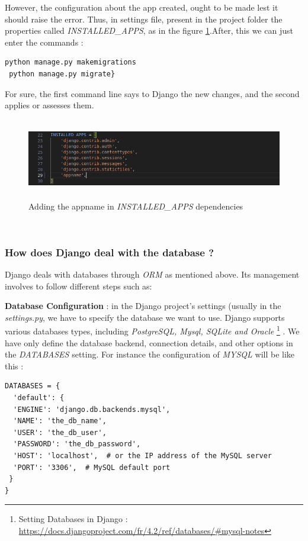 \documentclass[12pt,a4paper]{report}
\begin{document}
 \newline However, the configuration about the app created, ought to be made lest it should raise the error. Thus, in settings file, present in the project folder the properties called \textit{INSTALLED\_APPS}, as in the figure \ref{fig:appinstallname}.\newline After, this we can just enter the commands : 
 \begin{lstlisting}[style=stylepython]
 python manage.py makemigrations
 python manage.py migrate}
\end{lstlisting}
For sure, the first command line says to Django the new changes, and the second applies or assesses them. 
\begin{figure}
	\centering
	\includegraphics[width=1\linewidth, height=3.5cm]{appInstallName}
	\caption{Adding the appname in \textit{INSTALLED\_APPS} dependencies }
	\label{fig:appinstallname}
\end{figure} 
\\
\newline
\subsubsection*{How does Django deal with the database ?} 
Django deals with databases through \textit{ORM} as mentioned above. Its management involves to follow different steps such as:

\textbf{Database Configuration } : in the Django project's settings (usually in the \textit{settings.py}, we have to specify the database we want to use. Django supports various databases types, including \textit{PostgreSQL, Mysql, SQLite and Oracle} \footnote{Setting Databases in Django : \url{https://docs.djangoproject.com/fr/4.2/ref/databases/\#mysql-notes}}  . We have only define the database backend, connection details, and other options in the \textit{DATABASES} setting. For instance the configuration of \textit{MYSQL} will be like this : 
\begin{lstlisting}[style=stylepython]
DATABASES = {
  'default': {
  'ENGINE': 'django.db.backends.mysql',
  'NAME': 'the_db_name',
  'USER': 'the_db_user',
  'PASSWORD': 'the_db_password',
  'HOST': 'localhost',  # or the IP address of the MySQL server
  'PORT': '3306',  # MySQL default port
 }
}
\end{lstlisting} 
\end{document}
